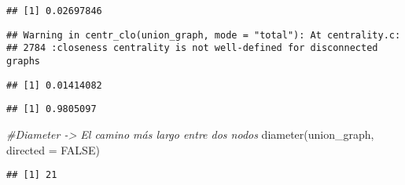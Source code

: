 \documentclass[
]{book}
\newenvironment{Shaded}{\begin{snugshade}}{\end{snugshade}}
\newcommand{\AttributeTok}[1]{\textcolor[rgb]{0.77,0.63,0.00}{#1}}
\newcommand{\CommentTok}[1]{\textcolor[rgb]{0.56,0.35,0.01}{\textit{#1}}}
\newcommand{\ConstantTok}[1]{\textcolor[rgb]{0.00,0.00,0.00}{#1}}
\newcommand{\FunctionTok}[1]{\textcolor[rgb]{0.00,0.00,0.00}{#1}}
\newcommand{\NormalTok}[1]{#1}
\newcommand{\SpecialCharTok}[1]{\textcolor[rgb]{0.00,0.00,0.00}{#1}}
\newcommand{\StringTok}[1]{\textcolor[rgb]{0.31,0.60,0.02}{#1}}
\begin{document}
\begin{verbatim}
## [1] 0.02697846
\end{verbatim}

\begin{Shaded}
\end{Shaded}

\begin{verbatim}
## Warning in centr_clo(union_graph, mode = "total"): At centrality.c:
## 2784 :closeness centrality is not well-defined for disconnected graphs
\end{verbatim}

\begin{verbatim}
## [1] 0.01414082
\end{verbatim}

\begin{Shaded}
\end{Shaded}

\begin{verbatim}
## [1] 0.9805097
\end{verbatim}

\begin{Shaded}
\begin{Highlighting}[]
\CommentTok{\#Diameter {-}\textgreater{} El camino más largo entre dos nodos}
\FunctionTok{diameter}\NormalTok{(union\_graph, }\AttributeTok{directed =} \ConstantTok{FALSE}\NormalTok{)}
\end{Highlighting}
\end{Shaded}

\begin{verbatim}
## [1] 21
\end{verbatim}
\end{document}
